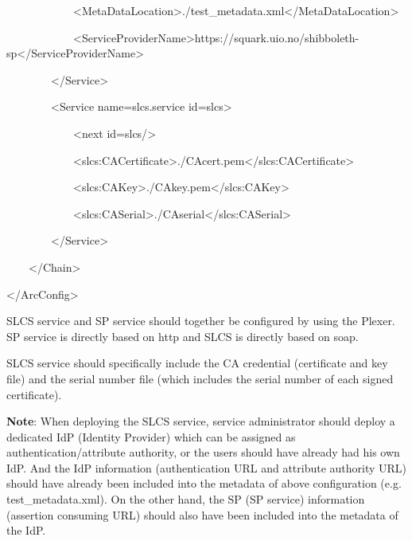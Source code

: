\documentclass{article}
\begin{document}
{\ttfamily\color{black}
\ \ \ \ \ \ \ \ \ \ \ \ {\textless}MetaDataLocation{\textgreater}./test\_metadata.xml{\textless}/MetaDataLocation{\textgreater}
}

{\ttfamily\color{black}
\ \ \ \ \ \ \ \ \ \ \ \ {\textless}ServiceProviderName{\textgreater}https://squark.uio.no/shibboleth-sp{\textless}/ServiceProviderName{\textgreater}
}

{\ttfamily\color{black}
\ \ \ \ \ \ \ \ {\textless}/Service{\textgreater} }

{\ttfamily\color{black}
\ \ \ \ \ \ \ \ {\textless}Service
name={\textquotedbl}\textcolor[rgb]{0.8627451,0.13725491,0.0}{slcs.service}{\textquotedbl}
id={\textquotedbl}slcs{\textquotedbl}{\textgreater} }

{\ttfamily\color{black}
\ \ \ \ \ \ \ \ \ \ \ \ {\textless}next
id={\textquotedbl}slcs{\textquotedbl}/{\textgreater} }

{\ttfamily\color{black}
\ \ \ \ \ \ \ \ \ \ \ \ {\textless}slcs:CACertificate{\textgreater}./CAcert.pem{\textless}/slcs:CACertificate{\textgreater}
}

{\ttfamily\color{black}
\ \ \ \ \ \ \ \ \ \ \ \ {\textless}slcs:CAKey{\textgreater}./CAkey.pem{\textless}/slcs:CAKey{\textgreater}
}

{\ttfamily\color{black}
\ \ \ \ \ \ \ \ \ \ \ \ {\textless}slcs:CASerial{\textgreater}./CAserial{\textless}/slcs:CASerial{\textgreater}
}

{\ttfamily\color{black}
\ \ \ \ \ \ \ \ {\textless}/Service{\textgreater} }

{\ttfamily\color{black}
\ \ \ \ {\textless}/Chain{\textgreater} }

{\ttfamily\color{black}
{\textless}/ArcConfig{\textgreater} }

{\color{black}
SLCS service and SP service should together be configured by using the
Plexer. SP service is directly based on http and SLCS is directly based
on soap. }

{\color{black}
SLCS service should specifically include the CA credential (certificate
and key file) and the serial number file (which includes the serial
number of each signed certificate).}

{\color{black}
\textbf{Note}: When deploying the SLCS service, service administrator
should deploy a dedicated IdP (Identity Provider) which can be assigned
as authentication/attribute authority, or the users should have already
had his own IdP. And the IdP information (authentication URL and
attribute authority URL) should have already been included into the
metadata of above configuration (e.g. test\_metadata.xml). On the other
hand, the SP (SP service) information (assertion consuming URL) should
also have been included into the metadata of the IdP.}
\end{document}
